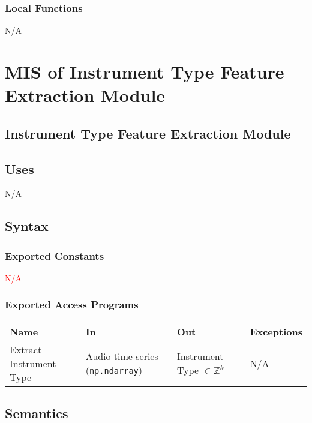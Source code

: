 \documentclass[12pt, titlepage]{article}
\begin{document}
\subsubsection{Local Functions}
N/A


\section{MIS of Instrument Type Feature Extraction Module} 

\subsection{Instrument Type Feature Extraction Module}

\subsection{Uses}
N/A

\subsection{Syntax}

\subsubsection{Exported Constants}
\textcolor{red}{N/A}

\subsubsection{Exported Access Programs}

\begin{center}
\begin{tabular}{p{2cm} p{4cm} p{4cm} p{2cm}}
\hline
\textbf{Name} & \textbf{In} & \textbf{Out} & \textbf{Exceptions}\\
\hline%
Extract Instrument Type &Audio time series (\texttt{np.ndarray}) & Instrument Type $\in \mathbb{Z}^k$ & N/A \\
\hline
\end{tabular}
\end{center}

\subsection{Semantics}
\end{document}
